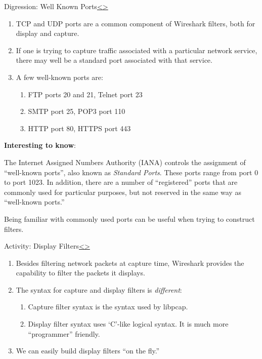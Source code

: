\documentclass[12pt]{extarticle}
\newenvironment{instructionblock}{\Large\bgroup}{\egroup}
\newcommand{\ben}{\begin{enumerate}}
\newcommand{\een}{\end{enumerate}}
\begin{document}
\pagebreak
\begin{slide}{Digression: Well Known Ports}{\hyperref[slide 10]{\textless}\hyperref[slide 12]{\textgreater}}
\begin{instructionblock}
\begin{enumerate}
\item TCP and UDP ports are a common component of Wireshark filters, both for display and capture.
\item If one is trying to capture traffic associated with a particular network service, there may well be a standard port associated with that service.
\item A few well-known ports are:
	\ben
	\item FTP ports 20 and 21, Telnet port 23
	\item SMTP port 25, POP3 port 110
	\item HTTP port 80, HTTPS port 443
	\een
\end{enumerate}
\end{instructionblock}
\end{slide}
\vspace{6mm}
\noindent
\textbf{Interesting to know}:

\vspace{2mm}
\noindent
The Internet Assigned Numbers Authority (IANA) controls the assignment of ``well-known ports'', also known as \textit{Standard Ports}.  These ports range from port 0 to port 1023.  In addition, there are a number of ``registered'' ports that are commonly used for particular purposes, but not reserved in the same way as ``well-known ports.''

\vspace{2mm}
\noindent
Being familiar with commonly used ports can be useful when trying to construct filters.




\pagebreak
\begin{slide}{Activity: Display Filters}{\hyperref[slide 11]{\textless}\hyperref[slide 13]{\textgreater}}
\begin{instructionblock}
\begin{enumerate}
\item Besides filtering network packets at capture time, Wireshark provides the capability to filter the packets it displays.
\item The syntax for capture and display filters is \textit{different}:
	\ben
	\item Capture filter syntax is the syntax used by libpcap.  
	\item Display filter syntax uses `C'-like logical syntax.  It is much more ``programmer'' friendly.
	\een
\item We can easily build display filters ``on the fly.''
\end{enumerate}
\end{instructionblock}
\end{slide}
\end{document}
